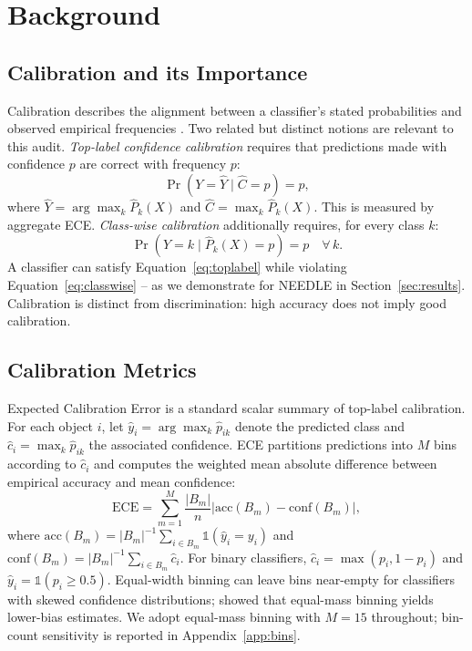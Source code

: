 \documentclass[twocolumn]{aastex631}
\begin{document}
\section{Background} \label{sec:background}

\subsection{Calibration and its Importance}\label{sec:calibration}

Calibration describes the alignment between a classifier's stated
probabilities and observed empirical frequencies \citep{dawid1982}.
Two related but distinct notions are relevant to this audit.
\textit{Top-label confidence calibration} \citep{guo2017} requires
that predictions made with confidence $p$ are correct with frequency $p$:
\begin{equation}
    \Pr(Y = \hat{Y} \mid \hat{C} = p) = p,
    \label{eq:toplabel}
\end{equation}
where $\hat{Y} = \arg\max_k \hat{P}_k(X)$ and
$\hat{C} = \max_k \hat{P}_k(X)$. This is measured by aggregate ECE.
\textit{Class-wise calibration} \citep{nixon2019} additionally
requires, for every class $k$:
\begin{equation}
    \Pr(Y = k \mid \hat{P}_k(X) = p) = p \quad \forall\, k.
    \label{eq:classwise}
\end{equation}
A classifier can satisfy Equation~\ref{eq:toplabel} while violating
Equation~\ref{eq:classwise} -- as we demonstrate for NEEDLE in
Section~\ref{sec:results}. Calibration is distinct from
discrimination: high accuracy does not imply good calibration.

\subsection{Calibration Metrics}\label{sec:metrics}

Expected Calibration Error \citep[ECE;][]{naeini2015} is a
standard scalar summary of top-label calibration. For each object
$i$, let $\hat{y}_i = \arg\max_k \hat{p}_{ik}$ denote the predicted
class and $\hat{c}_i = \max_k \hat{p}_{ik}$ the associated
confidence. ECE partitions predictions into $M$ bins according to
$\hat{c}_i$ and computes the weighted mean absolute difference
between empirical accuracy and mean confidence:
\begin{equation}
    \text{ECE} = \sum_{m=1}^{M} \frac{|B_m|}{n}
    \left| \text{acc}(B_m) - \text{conf}(B_m) \right|,
    \label{eq:ece}
\end{equation}
where $\text{acc}(B_m) =
|B_m|^{-1}\sum_{i\in B_m}\mathbb{1}(\hat{y}_i=y_i)$ and
$\text{conf}(B_m)=|B_m|^{-1}\sum_{i\in B_m}\hat{c}_i$.
For binary classifiers, $\hat{c}_i=\max(p_i,1-p_i)$ and
$\hat{y}_i=\mathbb{1}(p_i\geq 0.5)$. Equal-width binning can leave
bins near-empty for classifiers with skewed confidence distributions;
\citet{roelofs2022} showed that equal-mass binning yields lower-bias
estimates. We adopt equal-mass binning with $M=15$ throughout;
bin-count sensitivity is reported in Appendix~\ref{app:bins}.
\end{document}
